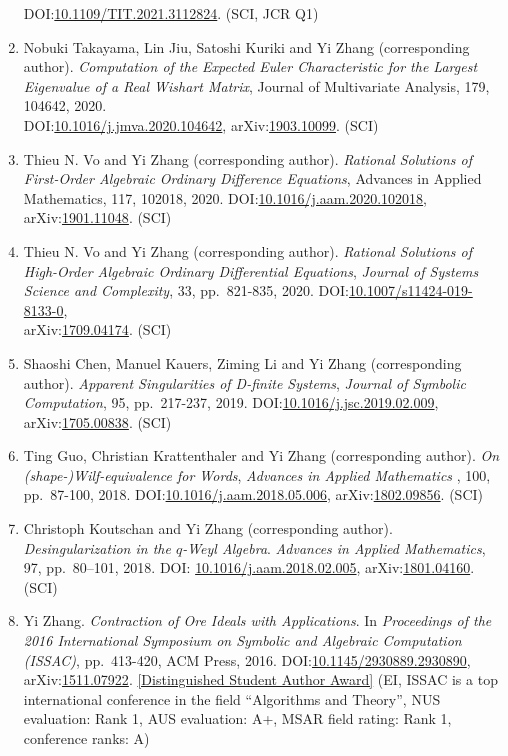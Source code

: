 \documentclass[a4paper,12pt]{article}
\begin{document}
\begin{enumerate}
DOI:\href{https://doi.org/10.1109/TIT.2021.3112824}{10.1109/TIT.2021.3112824}. (SCI, JCR Q1)
 \item Nobuki Takayama, Lin Jiu, Satoshi Kuriki and Yi Zhang (corresponding author). 
 {\em Computation of the Expected Euler Characteristic for the Largest Eigenvalue of a Real Wishart Matrix}, Journal of Multivariate Analysis, 179, 104642, 2020. \\
 DOI:\href{https://doi.org/10.1016/j.jmva.2020.104642}{10.1016/j.jmva.2020.104642}, 
 arXiv:\href{http://arxiv.org/abs/1903.10099}{1903.10099}. (SCI)
 \item Thieu N. Vo and Yi Zhang (corresponding author). 
{\em Rational Solutions of First-Order Algebraic Ordinary Difference Equations},  Advances in Applied Mathematics, 117, 102018, 2020. 
DOI:\href{https://doi.org/10.1016/j.aam.2020.102018}{10.1016/j.aam.2020.102018},
arXiv:\href{http://arxiv.org/abs/1901.11048}{1901.11048}. (SCI)
 \item Thieu N. Vo and Yi Zhang (corresponding author). {\em Rational Solutions of High-Order Algebraic Ordinary Differential Equations},  {\em Journal of Systems Science and Complexity}, 33, pp.\ 821-835, 2020. DOI:\href{https://link.springer.com/article/10.1007/s11424-019-8133-0}{10.1007/s11424-019-8133-0}, \\
 arXiv:\href{https://arxiv.org/abs/1709.04174}{1709.04174}. (SCI)
  \item Shaoshi Chen, Manuel Kauers, Ziming Li and Yi Zhang (corresponding author). {\em Apparent Singularities of D-finite Systems}, 
 {\em  Journal of Symbolic Computation},  95, pp.\ 217-237, 2019. DOI:\href{https://doi.org/10.1016/j.jsc.2019.02.009}{10.1016/j.jsc.2019.02.009}, arXiv:\href{http://arxiv.org/abs/1705.00838}{1705.00838}. (SCI)
\item Ting Guo, Christian Krattenthaler and Yi Zhang (corresponding author).
{\em On (shape-)Wilf-equivalence for Words}, 
{\em  Advances in Applied Mathematics} , 100, pp.\ 87-100, 2018. 
DOI:\href{https://doi.org/10.1016/j.aam.2018.05.006}{10.1016/j.aam.2018.05.006}, 
arXiv:\href{https://arxiv.org/pdf/1802.09856.pdf}{1802.09856}. (SCI)
\item Christoph Koutschan and Yi Zhang (corresponding author). {\em Desingularization in the $q$-Weyl Algebra}. 
{\em Advances in Applied Mathematics}, 97, pp.\ 80–101, 2018. 
DOI: \href{http://dx.doi.org/10.1016/j.aam.2018.02.005}{10.1016/j.aam.2018.02.005},
arXiv:\href{https://arxiv.org/abs/1801.04160}{1801.04160}. (SCI) 
\item Yi Zhang. {\em Contraction of Ore Ideals with Applications}. 
In {\em Proceedings of the 2016 International Symposium on Symbolic and Algebraic Computation (ISSAC)}, 
pp.\ 413-420, ACM Press, 2016. DOI:\href{http://dl.acm.org/citation.cfm?id=2930890}{10.1145/2930889.2930890},
arXiv:\href{https://arxiv.org/abs/1511.07922}{1511.07922}. 
\href{https://www.sigsam.org/Awards/ISSACAwards.html}{[Distinguished Student Author Award]} 
(EI, ISSAC is a top international conference in the field ``Algorithms and Theory'', NUS evaluation: Rank 1, AUS evaluation: A+, MSAR field rating: Rank 1, conference ranks: A) 
\end{enumerate}
\end{document}
